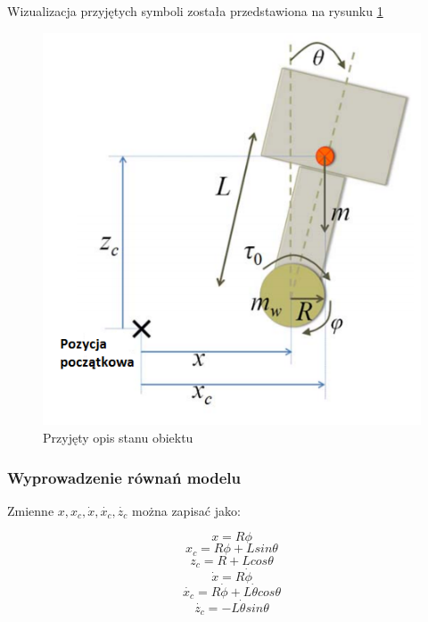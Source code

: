 Wizualizacja przyjętych symboli została przedstawiona na rysunku \ref{fig:img4_01}

\begin{figure}[h]
	\centering
	\includegraphics[scale=0.6]{img4_01.png}
	\caption{Przyjęty opis stanu obiektu}
	\label{fig:img4_01}
\end{figure}


\subsubsection{Wyprowadzenie równań modelu}
\label{wypr_rownan}
Zmienne $x, x_c, \dot{x}, \dot{x_c}, \dot{z_c} $ można zapisać jako:

\begin{equation}   x=R \phi  
\label{4row01}      \end{equation}
\begin{equation}   x_c=R \phi +Lsin\theta        \end{equation}
\begin{equation}   z_c=R +Lcos\theta       \end{equation}
\begin{equation}    \dot{x}= R \dot{\phi}      \end{equation}
\begin{equation}     \dot{x_c}= R \dot{\phi} + L\dot{\theta}cos\theta    \end{equation}
\begin{equation}  \dot{z_c}=-L\dot{\theta}sin\theta   
\label{4row06}       \end{equation}


